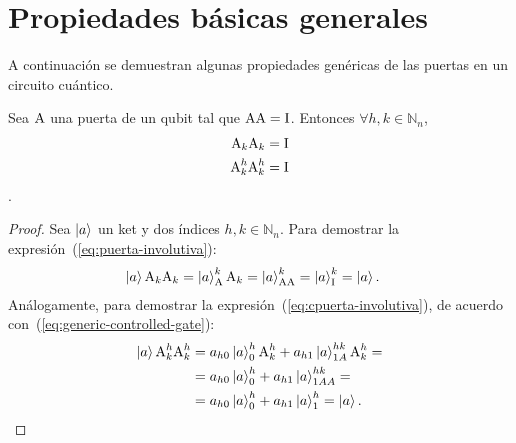 \section{Propiedades básicas generales}
	A continuación se demuestran algunas propiedades genéricas de las puertas en un circuito cuántico.
	\begin{proposition}
		Sea $\text{A}$ una puerta de un qubit tal que $\text{A}\text{A}=\text{I}$. Entonces $\forall h,k \in \mathbb{N}_n$,
		\begin{align}
			\label{eq:puerta-involutiva}
			\text{A}_k\text{A}_k &= \text{I}\\
			\label{eq:cpuerta-involutiva}
			\text{A}^{h}_{k}\text{A}^{h}_{k} &= \text{I}
		\end{align}
		.
	\end{proposition}
	\begin{proof}
		Sea $\ket{a}$ un ket y dos índices $h,k \in \mathbb{N}_n$.
		Para demostrar la expresión~(\ref{eq:puerta-involutiva}):
		\begin{align*}
			\ket{a}\text{A}_k\text{A}_k
			&=\ket{a}^{k}_{\text{A}}\text{A}_k=\ket{a}^k_{\text{AA}}=\ket{a}^{k}_{\text{I}}=\ket{a}.
		\end{align*}
		Análogamente, para demostrar la expresión~(\ref{eq:cpuerta-involutiva}), de acuerdo con~(\ref{eq:generic-controlled-gate}):
		\begin{align*}
			\ket{a}\text{A}^{h}_{k}\text{A}^{h}_{k}
			&=a_{h0}\ket{a}^{h}_{0}\text{A}^{h}_{k}+a_{h1}\ket{a}^{hk}_{1A}\text{A}^{h}_{k}=\\
			&=a_{h0}\ket{a}^{h}_{0}+a_{h1}\ket{a}^{hk}_{1AA}=\\
			&=a_{h0}\ket{a}^{h}_{0}+a_{h1}\ket{a}^{h}_{1}=\ket{a}.
		\end{align*}
	\end{proof}

